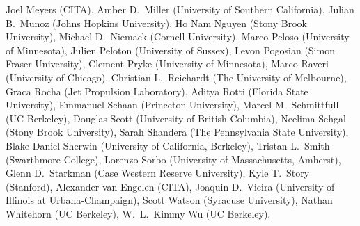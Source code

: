 Joel Meyers (CITA),
Amber D.~Miller (University of Southern California),
Julian B.~Munoz (Johns Hopkins University),
Ho Nam Nguyen (Stony Brook University),
Michael D.~Niemack (Cornell University),
Marco Peloso (University of Minnesota),
Julien Peloton (University of Sussex),
Levon Pogosian (Simon Fraser University),
Clement Pryke (University of Minnesota),
Marco Raveri (University of Chicago),
Christian L.~Reichardt (The University of Melbourne),
Graca Rocha (Jet Propulsion Laboratory),
Aditya Rotti (Florida State University),
Emmanuel Schaan (Princeton University),
Marcel M.~Schmittfull (UC Berkeley),
Douglas Scott (University of British Columbia),
Neelima Sehgal (Stony Brook University),
Sarah Shandera (The Pennsylvania State University),
Blake Daniel Sherwin (University of California, Berkeley),
Tristan L.~Smith (Swarthmore College),
Lorenzo Sorbo (University of Massachusetts, Amherst),
Glenn D.~Starkman (Case Western Reserve University),
Kyle T.~Story (Stanford),
Alexander van Engelen (CITA),
Joaquin D.~Vieira (University of Illinois at Urbana-Champaign),
Scott Watson (Syracuse University),
Nathan Whitehorn (UC Berkeley),
W.~L.~Kimmy Wu (UC Berkeley).
